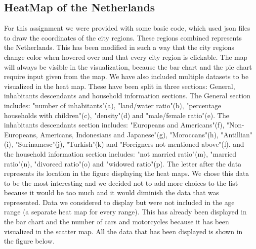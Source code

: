 \documentclass[a4paper,twoside,11pt]{article}
\begin{document}
\subsection{HeatMap of the Netherlands}
For this assignment we were provided with some basic code, which used json files to draw the coordinates of the city regions. These regions combined represents the Netherlands. This has been modified in such a way that the city regions change color when hovered over and that every city region is clickable. The map will always be visible in the visualization, because the bar chart and the pie chart require input given from the map. \newline
We have also included multiple datasets to be visualized in the heat map. These have been split in three sections: General, inhabitants descendants and household information sections. \newline
The General section includes: "number of inhabitants"(a), "land/water ratio"(b), "percentage households with children"(c), "density"(d) and "male/female ratio"(e). \newline
The inhabitants descendants section includes: "Europeans and Americans"(f), "Non-Europeans, Americans, Indonesians and Japanese"(g), "Moroccans"(h), "Antillian"(i), "Surinamese"(j), "Turkish"(k) and "Foreigners not mentioned above"(l). \newline
and the household information section includes: "not married ratio"(m), "married ratio"(n), "divorced ratio"(o) and "widowed ratio"(p). The letter after the data represents its location in the figure displaying the heat maps. \newline
We chose this data to be the most interesting and we decided not to add more choices to the list because it would be too much and it would diminish the data that was represented. Data we considered to display but were not included in the age range (a separate heat map for every range). This has already been displayed in the bar chart and the number of cars and motorcycles because it has been visualized in the scatter map. \newline
All the data that has been displayed is shown in the figure below. \newline
\end{document}
